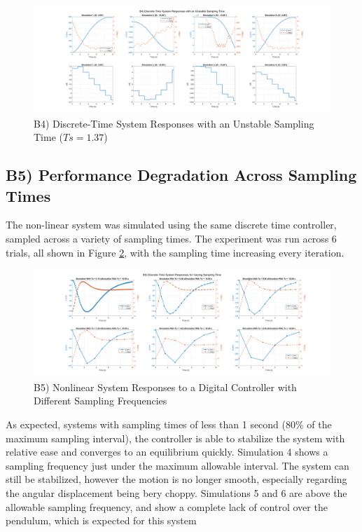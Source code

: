 \documentclass{article}
\begin{document}
\begin{figure}[H]
    \centering
    \includegraphics[width=\textwidth]{figures/B4.png}
    \caption{B4) Discrete-Time System Responses with an Unstable Sampling Time ($Ts=1.37$)}
    \label{B4}
\end{figure}



\subsection*{B5) Performance Degradation Across Sampling Times}

The non-linear system was simulated using the same discrete time controller, sampled across a variety of sampling times. The experiment was run across 6 trials, all shown in Figure \ref{B5}, with the sampling time increasing every iteration.

\begin{figure}[H]
    \centering
    \includegraphics[width=\textwidth]{figures/b5.png}
    \caption{B5) Nonlinear System Responses to a Digital Controller with Different Sampling Frequencies}
    \label{B5}
\end{figure}

As expected, systems with sampling times of less than 1 second (80\% of the maximum sampling interval), the controller is able to stabilize the system with relative ease and converges to an equilibrium quickly. Simulation 4 shows a sampling frequency just under the maximum allowable interval. The system can still be stabilized, however the motion is no longer smooth, especially regarding the angular displacement being bery choppy. Simulations 5 and 6 are above the allowable sampling frequency, and show a complete lack of control over the pendulum, which is expected for this system
\end{document}
